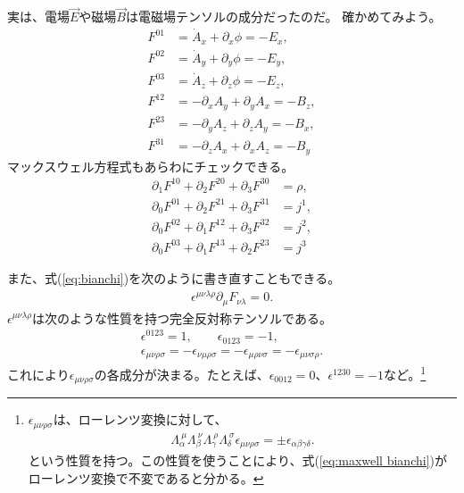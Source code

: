\documentclass[10pt,a4paper]{jarticle}
\begin{document}
実は、電場$\vec E$や磁場$\vec B$は電磁場テンソルの成分だったのだ。
確かめてみよう。
\begin{align}
F^{01} &= \dot A_x + \partial_x \phi = -E_x, \\
F^{02} &= \dot A_y + \partial_y \phi = -E_y, \\
F^{03} &= \dot A_z + \partial_z \phi = -E_z, \\
F^{12} &= -\partial_x A_y + \partial_y A_x = -B_z, \\
F^{23} &= -\partial_y A_z + \partial_z A_y = -B_x, \\
F^{31} &= -\partial_z A_x + \partial_x A_z = -B_y
\end{align}
%
マックスウェル方程式もあらわにチェックできる。
\begin{align}
\partial_1 F^{10} + \partial_2 F^{20} + \partial_3 F^{30} &= \rho, \\
\partial_0 F^{01} + \partial_2 F^{21} + \partial_3 F^{31} &= j^1, \\
\partial_0 F^{02} + \partial_1 F^{12} + \partial_3 F^{32} &= j^2, \\
\partial_0 F^{03} + \partial_1 F^{13} + \partial_2 F^{23} &= j^3
\end{align}

また、式(\ref{eq:bianchi})を次のように書き直すこともできる。
\begin{align}
\epsilon^{\mu\nu\lambda\rho} \partial_\mu F_{\nu\lambda}  = 0. \label{eq:maxwell bianchi}
\end{align}
$\epsilon^{\mu\nu\lambda\rho}$は次のような性質を持つ完全反対称テンソルである。
\begin{align}
\epsilon^{0123} = 1, \qquad
\epsilon_{0123} = -1, \\
\epsilon_{\mu\nu\rho\sigma}
= -\epsilon_{\nu\mu\rho\sigma}
= -\epsilon_{\mu\rho\nu\sigma}
= -\epsilon_{\mu\nu\sigma\rho}.
\end{align}
これにより$\epsilon_{\mu\nu\rho\sigma}$の各成分が決まる。たとえば、$\epsilon_{0012} = 0$、$\epsilon^{1230} = -1$など。\footnote{
$\epsilon_{\mu\nu\rho\sigma}$は、ローレンツ変換に対して、
\begin{align}
\Lambda_{\alpha}^{~\mu}
\Lambda_{\beta}^{~\nu}
\Lambda_{\gamma}^{~\rho}
\Lambda_{\delta}^{~\sigma}
\epsilon_{\mu\nu\rho\sigma}
=
\pm \epsilon_{\alpha\beta\gamma\delta}.
\end{align}
という性質を持つ。この性質を使うことにより、式(\ref{eq:maxwell bianchi})がローレンツ変換で不変であると分かる。
}
\end{document}
